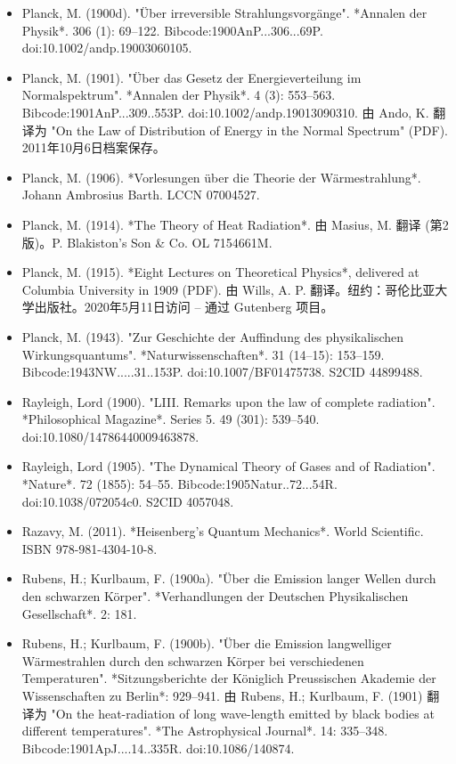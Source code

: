 \begin{itemize}
\item Planck, M. (1900d). "Über irreversible Strahlungsvorgänge". *Annalen der Physik*. 306 (1): 69–122. Bibcode:1900AnP...306...69P. doi:10.1002/andp.19003060105.  
\item Planck, M. (1901). "Über das Gesetz der Energieverteilung im Normalspektrum". *Annalen der Physik*. 4 (3): 553–563. Bibcode:1901AnP...309..553P. doi:10.1002/andp.19013090310.  
  由 Ando, K. 翻译为 "On the Law of Distribution of Energy in the Normal Spectrum" (PDF). 2011年10月6日档案保存。
\item Planck, M. (1906). *Vorlesungen über die Theorie der Wärmestrahlung*. Johann Ambrosius Barth. LCCN 07004527.  
\item Planck, M. (1914). *The Theory of Heat Radiation*. 由 Masius, M. 翻译 (第2版)。P. Blakiston's Son & Co. OL 7154661M.  
\item Planck, M. (1915). *Eight Lectures on Theoretical Physics*, delivered at Columbia University in 1909 (PDF). 由 Wills, A. P. 翻译。纽约：哥伦比亚大学出版社。2020年5月11日访问 – 通过 Gutenberg 项目。  
\item Planck, M. (1943). "Zur Geschichte der Auffindung des physikalischen Wirkungsquantums". *Naturwissenschaften*. 31 (14–15): 153–159. Bibcode:1943NW.....31..153P. doi:10.1007/BF01475738. S2CID 44899488.  
\item Rayleigh, Lord (1900). "LIII. Remarks upon the law of complete radiation". *Philosophical Magazine*. Series 5. 49 (301): 539–540. doi:10.1080/14786440009463878.  
\item Rayleigh, Lord (1905). "The Dynamical Theory of Gases and of Radiation". *Nature*. 72 (1855): 54–55. Bibcode:1905Natur..72...54R. doi:10.1038/072054c0. S2CID 4057048.  
\item Razavy, M. (2011). *Heisenberg's Quantum Mechanics*. World Scientific. ISBN 978-981-4304-10-8.  
\item Rubens, H.; Kurlbaum, F. (1900a). "Über die Emission langer Wellen durch den schwarzen Körper". *Verhandlungen der Deutschen Physikalischen Gesellschaft*. 2: 181.  
\item Rubens, H.; Kurlbaum, F. (1900b). "Über die Emission langwelliger Wärmestrahlen durch den schwarzen Körper bei verschiedenen Temperaturen". *Sitzungsberichte der Königlich Preussischen Akademie der Wissenschaften zu Berlin*: 929–941.  
  由 Rubens, H.; Kurlbaum, F. (1901) 翻译为 "On the heat-radiation of long wave-length emitted by black bodies at different temperatures". *The Astrophysical Journal*. 14: 335–348. Bibcode:1901ApJ....14..335R. doi:10.1086/140874.  

\end{itemize}
